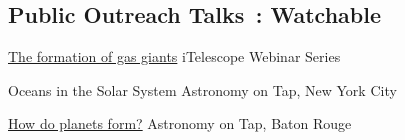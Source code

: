 \documentclass[10pt]{article} %
\begin{document}
\begin{paracol}{1}


\section{Public Outreach Talks \footnotesize {\faVideoCamera}\,: Watchable \phantom{XX.}}





	
	{\href{https://www.youtube.com/watch?v=w7dNKDIJ9DM}{The formation of gas giants} \faVideoCamera}
	{iTelescope Webinar Series}

	{Oceans in the Solar System}
	{Astronomy on Tap, New York City}
	
	{\href{https://www.youtube.com/watch?v=E-OefNM564E}{How do planets form?} \faVideoCamera}
	{Astronomy on Tap, Baton Rouge}






	



\end{paracol}
\end{document}
